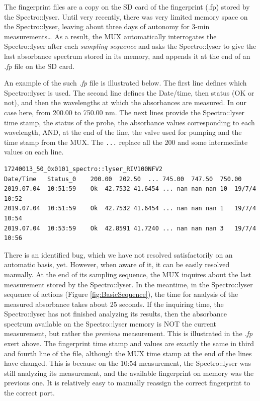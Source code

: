 \documentclass[]{book}
\begin{document}
The fingerprint files are a copy on the SD card of the fingerprint (.fp) stored by the Spectro::lyser. Until very recently, there was very limited memory space on the Spectro::lyser, leaving about three days of autonomy for 3-min measurements\ldots{} As a result, the MUX automatically interrogates the Spectro::lyser after each \emph{sampling sequence} and asks the Spectro::lyser to give the last absorbance spectrum stored in its memory, and appends it at the end of an \emph{.fp} file on the SD card.

An example of the such \emph{.fp} file is illustrated below. The first line defines which Spectro::lyser is used. The second line defines the Date/time, then status (OK or not), and then the wavelengths at which the absorbances are measured. In our case here, from 200.00 to 750.00 nm. The next lines provide the Spectro::lyser time stamp, the status of the probe, the absorbance values corresponding to each wavelength, AND, at the end of the line, the valve used for pumping and the time stamp from the MUX. The \texttt{...} replace all the 200 and some intermediate values on each line.

\begin{verbatim}
17240013_50_0x0101_spectro::lyser_RIV100NFV2
Date/Time   Status_0    200.00  202.50  ... 745.00  747.50  750.00
2019.07.04  10:51:59    Ok  42.7532 41.6454 ... nan nan nan 10  19/7/4 10:52
2019.07.04  10:51:59    Ok  42.7532 41.6454 ... nan nan nan 1   19/7/4 10:54
2019.07.04  10:53:59    Ok  42.8591 41.7240 ... nan nan nan 3   19/7/4 10:56
\end{verbatim}

There is an identified bug, which we have not resolved satisfactorily on an automatic basis, yet. However, when aware of it, it can be easily resolved manually. At the end of its sampling sequence, the MUX inquires about the last measurement stored by the Spectro::lyser. In the meantime, in the Spectro::lyser sequence of actions (Figure \ref{fig:BasicSequence}), the time for analysis of the measured absorbance takes about 25 seconds. If the inquiring time, the Spectro::lyser has not finished analyzing its results, then the absorbance spectrum available on the Spectro::lyser memory is NOT the current measurement, but rather the \emph{previous} measurement. This is illustrated in the \emph{.fp} exert above. The fingerprint time stamp and values are exactly the same in third and fourth line of the file, although the MUX time stamp at the end of the lines have changed. This is because on the 10:54 measurement, the Spectro::lyser was still analyzing its measurement, and the available fingerprint on memory was the previous one. It is relatively easy to manually reassign the correct fingerprint to the correct port.
\end{document}
